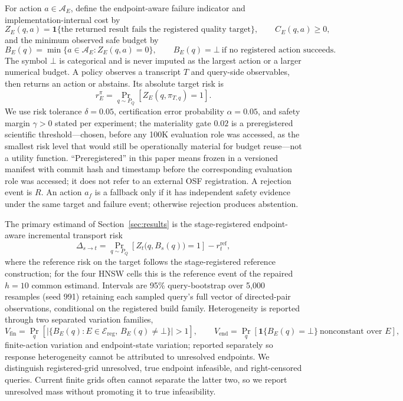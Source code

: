 \documentclass{article}
\renewcommand{\Pr}{\mathop{\mathrm{Pr}}}   %
\newcommand{\Acal}{\mathcal{A}}
\newcommand{\Ecal}{\mathcal{E}}
\newcommand{\BOT}{\bot}
\begin{document}
For action $a\in\Acal_E$, define the endpoint-aware failure indicator and implementation-internal cost by
\begin{equation}
Z_{E}(q,a)=\mathbf{1}\{\text{the returned result fails the registered quality target}\},\qquad
C_{E}(q,a)\ge 0,
\label{eq:zc}
\end{equation}
and the minimum observed safe budget by
\begin{equation}
B_{E}(q)=\min\{a\in\Acal_{E}:Z_{E}(q,a)=0\},\qquad
B_{E}(q)=\BOT\ \text{if no registered action succeeds}.
\label{eq:bmin}
\end{equation}
The symbol $\BOT$ is categorical and is never imputed as the largest action or a larger numerical budget. A
policy observes a transcript $T$ and query-side observables, then returns an action or abstains. Its
absolute target risk is
\begin{equation}
r_{E}^{\pi}=\Pr_{q\sim P_{Q}}\!\left[Z_{E}(q,\pi_{T,q})=1\right].
\label{eq:risk}
\end{equation}
We use risk tolerance $\delta=0.05$, certification error probability $\alpha=0.05$, and safety margin
$\gamma>0$ stated per experiment; the materiality gate $0.02$ is a preregistered scientific threshold---chosen, before any 100K evaluation
role was accessed, as the smallest risk level that would still be operationally material for budget
reuse---not a utility function. ``Preregistered'' in this paper means frozen in a versioned manifest with commit hash and
timestamp before the corresponding evaluation role was accessed; it does not refer to an external OSF
registration. A rejection event is $R$. An action $a_f$ is a fallback only if it has independent safety
evidence under the same target and failure event; otherwise rejection produces abstention.

The primary estimand of Section~\ref{sec:results} is the stage-registered endpoint-aware incremental
transport risk
\begin{equation}
\Delta_{s\rightarrow t}
=\Pr_{q\sim P_{Q}}\!\left[Z_{t}\big(q,B_{s}(q)\big){=}1\right]-r_{t}^{\mathrm{ref}},
\label{eq:delta}
\end{equation}
where the reference risk on the target follows the stage-registered reference construction; for the four
HNSW cells this is the reference event of the repaired $h{=}10$ common estimand. Intervals are 95\%
query-bootstrap over 5{,}000 resamples (seed 991) retaining each sampled query's full vector of directed-pair
observations, conditional on the registered build family. Heterogeneity is reported through two separated
variation families,
\begin{equation}
V_{\mathrm{fin}}=\Pr_{q}\!\left[\big|\{B_{E}(q):E\in\Ecal_{\mathrm{reg}},\,B_{E}(q)\neq\BOT\}\big|>1\right],
\qquad
V_{\mathrm{end}}=\Pr_{q}\!\left[\mathbf{1}\{B_{E}(q){=}\BOT\}\ \text{nonconstant over }E\right],
\label{eq:var}
\end{equation}
finite-action variation and endpoint-state variation; reported separately so response heterogeneity cannot
be attributed to unresolved endpoints. We distinguish registered-grid unresolved, true endpoint infeasible,
and right-censored queries. Current finite grids often cannot separate the latter two, so we report
unresolved mass without promoting it to true infeasibility.
\end{document}
